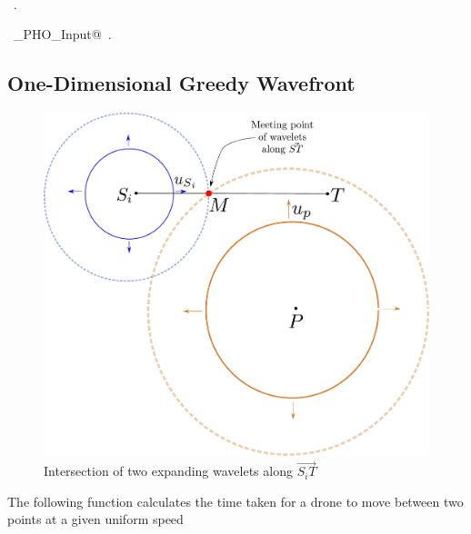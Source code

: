 \documentclass[10.0pt]{report}
\begin{document}
\begin{flushleft}
\begin{list}{}{}
\mbox{}\verb@@\\
\mbox{}\verb@@{\NWsep}
\end{list}
\vspace{-1.5ex}
\footnotesize
\begin{list}{}{\setlength{\itemsep}{-\parsep}\setlength{\itemindent}{-\leftmargin}}
\item \NWtxtMacroRefIn\ .
\item \NWtxtIdentsDefed\nobreak\  \verb@Single_PHO_Input@\nobreak\ .
\item{}
\end{list}
\vspace{4ex}
\end{flushleft}

\subsection{One-Dimensional Greedy Wavefront} \hspace{10mm}


\begin{figure}[H]
\centering
\includegraphics[width=14cm]{images/circular_wavelets_intersect_along_st.pdf}
\caption{Intersection of two expanding wavelets along $\vec{S_iT}$}
\end{figure}

The following function calculates the time taken for a drone to move between two points at a given uniform speed
 
\end{document}
